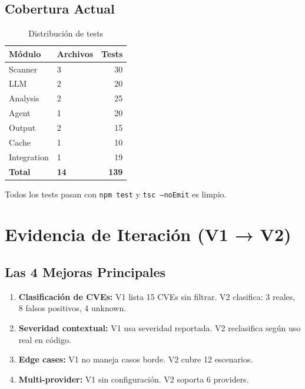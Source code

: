 \documentclass[11pt,a4paper]{article}
\begin{document}
\subsection{Cobertura Actual}

\begin{table}[H]
  \centering
  \caption{Distribución de tests}
  \begin{tabularx}{\textwidth}{l X r}
    \toprule
    \textbf{Módulo} & \textbf{Archivos} & \textbf{Tests} \\
    \midrule
    Scanner & 3 & ~30 \\
    LLM & 2 & ~20 \\
    Analysis & 2 & ~25 \\
    Agent & 1 & ~20 \\
    Output & 2 & ~15 \\
    Cache & 1 & ~10 \\
    Integration & 1 & ~19 \\
    \midrule
    \textbf{Total} & \textbf{14} & \textbf{139} \\
    \bottomrule
  \end{tabularx}
\end{table}

Todos los tests pasan con \texttt{npm test} y \texttt{tsc --noEmit} es limpio.

\section{Evidencia de Iteración (V1 → V2)}

\subsection{Las 4 Mejoras Principales}

\begin{enumerate}
  \item \textbf{Clasificación de CVEs:} V1 lista 15 CVEs sin filtrar. V2 clasifica: 3 reales, 8 falsos positivos, 4 unknown.
  \item \textbf{Severidad contextual:} V1 usa severidad reportada. V2 reclasifica según uso real en código.
  \item \textbf{Edge cases:} V1 no maneja casos borde. V2 cubre 12 escenarios.
  \item \textbf{Multi-provider:} V1 sin configuración. V2 soporta 6 providers.
\end{enumerate}
\end{document}
